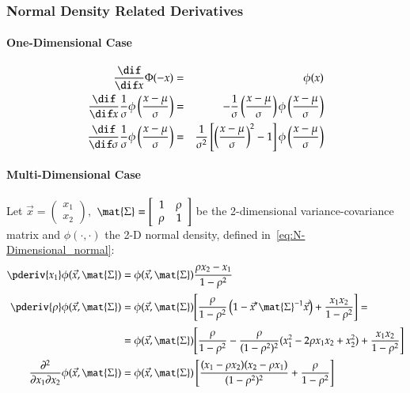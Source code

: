 \documentclass[a4paper]{article}
\numberwithin{equation}{subsection}
\begin{document}


\subsubsection{Normal Density Related Derivatives}

\paragraph{One-Dimensional Case}
\begin{eqnarray}
\frac{\dif}{\dif x} \Phi(-x) &=&
  \phi(x) \\
%
\frac{\dif}{\dif x} 
\frac{1}{\sigma} 
\phi \left( \frac{x-\mu}{\sigma} \right) &=&
  - \frac{1}{\sigma} 
    \left( \frac{x-\mu}{\sigma} \right)
    \phi \left( \frac{x-\mu}{\sigma} \right)
\\
\frac{\dif}{\dif \sigma} 
\frac{1}{\sigma} 
\phi \left( \frac{x-\mu}{\sigma} \right) &=&
    \frac{1}{\sigma^{2}} 
    \left[ \left( \frac{x-\mu}{\sigma} \right)^{2} - 1 \right]
    \phi \left( \frac{x-\mu}{\sigma} \right)
\end{eqnarray}

\paragraph{Multi-Dimensional Case}

Let 
\begin{math}
  \vec{x} = \left(
    \begin{array}{r}
      x_{1} \\ x_{2}
    \end{array}
  \right),
\end{math}
$\mat{\Sigma} = \left[
 \begin{array}{rr} 1 & \rho \\
 \rho & 1
\end{array}\right]$ be the 2-dimensional variance-covariance matrix
and $\phi(\cdot,\cdot)$ the 2-D normal density, defined
in~\eqref{eq:N-Dimensional_normal}:
\begin{align}
  \pderiv{x_{1}}
  \phi(\vec{x}, \mat{\Sigma})
  &=
  \phi(\vec{x}, \mat{\Sigma})
  \frac{\rho x_{2} - x_{1}}{1 - \rho^{2}}
  \\
  \pderiv{\rho}
  \phi(\vec{x}, \mat{\Sigma})
  &=
  \phi(\vec{x}, \mat{\Sigma})
  \Bigg[
  \frac{\rho}{1 - \rho^{2}}
  \left(
    1 - \vec{x}' \mat{\Sigma}^{-1} \vec{x}
  \right)
  +
  \frac{x_{1} x_{2}}{1 - \rho^{2}}
  \Bigg]
  =
  \notag\\
  &=
  \phi(\vec{x}, \mat{\Sigma})
  \Bigg[
  \frac{\rho}{1 - \rho^{2}}
  -
  \frac{\rho}{(1 - \rho^{2})^{2}}
  (x_{1}^{2} - 2 \rho x_{1} x_{2} + x_{2}^{2})
  +
  \frac{x_{1} x_{2}}{1 - \rho^{2}}
  \Bigg]
  \\
  \frac{\partial^{2}}{\partial x_{1} \partial x_{2}}
  \phi(\vec{x}, \mat{\Sigma})
  &=
  \phi(\vec{x}, \mat{\Sigma})
  \left[
    \frac{(x_{1} - \rho x_{2})(x_{2} - \rho x_{1})}
    {(1 - \rho^{2})^{2}}
    +
    \frac{\rho}{1 - \rho^{2}}
  \right]
\end{align}
\end{document}
